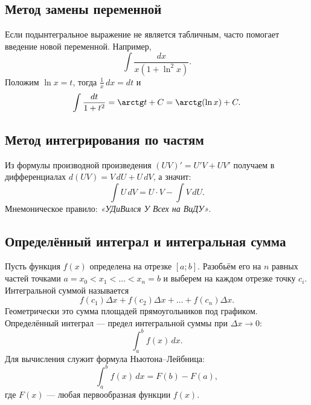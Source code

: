 \subsection*{Метод замены переменной}
Если подынтегральное выражение не является табличным, часто помогает введение новой переменной. Например,
\[
\int\frac{dx}{x(1+\ln^2x)}.
\]
Положим $\ln x=t$, тогда $\frac1x\,dx=dt$ и
\[
\int\frac{dt}{1+t^2}=\arctg t+C=\arctg(\ln x)+C.
\]

\subsection*{Метод интегрирования по частям}
Из формулы производной произведения $(UV)'=U'V+UV'$ получаем в дифференциалах $d(UV)=V\,dU+U\,dV$, а значит:
\[
  \int U\,dV=U\cdot V-\int V\,dU.
\]
Мнемоническое правило: \textit{«УДиВился У Всех на ВиДУ»}.

\subsection*{Определённый интеграл и интегральная сумма}
Пусть функция $f(x)$ определена на отрезке $[a;b]$. Разобьём его на $n$ равных частей точками $a=x_0<x_1<\dots<x_n=b$ и выберем на каждом отрезке точку $c_i$. Интегральной суммой называется
\[
f(c_1)\Delta x+f(c_2)\Delta x+\dots+f(c_n)\Delta x.
\]
Геометрически это сумма площадей прямоугольников под графиком. Определённый интеграл --- предел интегральной суммы при $\Delta x\to0$:
\[
\int_a^b f(x)\,dx.
\]
Для вычисления служит формула Ньютона--Лейбница:
\[
\int_a^b f(x)\,dx=F(b)-F(a),
\]
где $F(x)$ --- любая первообразная функции $f(x)$.
